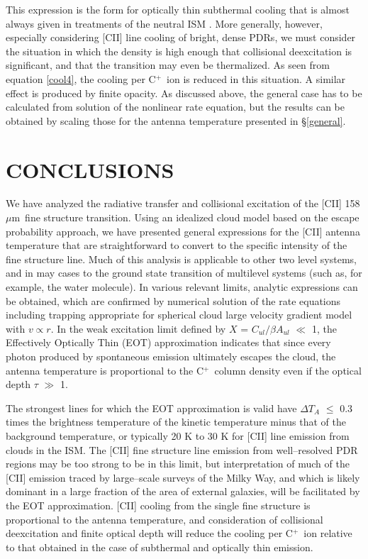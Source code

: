 \documentclass[12pt]{aastex}
\def \cp{C$^+$}
\def \C2{C{\sc II}}
\def \mic{$\mu$m}
\begin{document}
This expression is the form for optically thin subthermal cooling that is almost always given in treatments of the neutral ISM \citep[e.g.][]{draine2011}.  
More generally, however, especially considering [\C2] line cooling of bright, dense PDRs, we must consider the situation in which the density is high enough that collisional deexcitation is significant, and that the transition may even be thermalized.  
As seen from equation \ref{cool4}, the cooling per \cp\ ion is reduced in this situation.
A similar effect is produced by finite opacity. 
As discussed above, the general case has to be calculated from solution of the nonlinear rate equation, but the results can be obtained by scaling those for the antenna temperature presented in \S\ref{general}.  

\section{CONCLUSIONS}

We have analyzed the radiative transfer and collisional excitation of the [\C2] 158 \mic\ fine structure transition.  
Using an idealized cloud model based on the escape probability approach, we have presented general expressions for the [\C2] antenna temperature that are straightforward to convert to the specific intensity of the fine structure line.
Much of this analysis is applicable to other two level systems, and in may cases to the ground state transition of multilevel systems (such as, for example, the water molecule).
In various relevant limits, analytic expressions can be obtained, which are confirmed by numerical solution of the rate equations including trapping appropriate for spherical cloud large velocity gradient model with $v\propto r$.
In the weak excitation limit defined by $X$ = $C_{ul}/\beta A_{ul}$ $\ll$ 1, the Effectively Optically Thin (EOT) approximation indicates that since every photon produced by spontaneous emission ultimately escapes the cloud, the antenna temperature is proportional to the \cp\ column density even if the optical depth $\tau$ $\gg$ 1.

The strongest lines for which the EOT approximation is valid have $\Delta T_A$ $\leq$ 0.3 times the brightness temperature of the kinetic temperature minus that of the background temperature, or typically 20 K to 30 K for [\C2] line emission from clouds in the ISM.
The [\C2] fine structure line emission from well--resolved PDR regions may be too strong to be in this limit, but interpretation of much of the [\C2] emission traced by large--scale surveys of the Milky Way, and which is likely dominant in a large fraction of the area of external galaxies, will be facilitated by the EOT approximation.
[\C2] cooling from the single fine structure is proportional to the antenna temperature, and consideration of collisional deexcitation and finite optical depth will reduce the cooling per \cp\ ion relative to that obtained in the case of subthermal and  optically thin emission.
\end{document}
